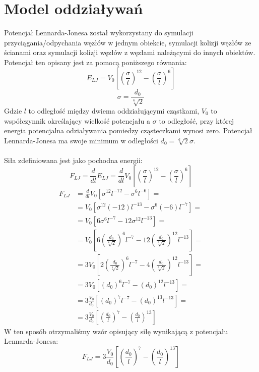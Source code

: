 \documentclass[12pt, letterpaper]{report}
\begin{document}
    \section{Model oddziaływań}
    Potencjał Lennarda-Jonesa został wykorzystany do symulacji przyciągania/odpychania 
    węzłów w jednym obiekcie, symulacji kolizji węzłów ze ścianami oraz symulacji
    kolizji węzłów z węzłami należącymi do innych obiektów. 
    Potencjał ten opisany jest za pomocą poniższego równania:
    \begin{equation}
        E_{LJ} = V_0 \left[ \left( \frac{\sigma}{l} \right)^{12} - \left( \frac{\sigma}{l} \right)^{6} \right]
    \end{equation}
    \begin{equation}
        \sigma = \frac{d_0}{\sqrt[6]{2}}
    \end{equation}
    Gdzie $l$ to odległość między dwiema oddziałującymi cząstkami, $V_0$ to współczynnik określający wielkość potencjału 
    a $\sigma$ to odległość, przy której energia potencjalna odziaływania pomiedzy cząsteczkami wynosi zero. 
    Potencjał Lennarda-Jonesa ma swoje minimum w odległości $d_0 = \sqrt[6]{2} \sigma$. \\ \\
    Siła zdefiniowana jest jako pochodna energii:
    \begin{equation}
        F_{LJ} = 
        \frac{d}{dl} E_{LJ} = 
        \frac{d}{dl} V_0 \left[ \left( \frac{\sigma}{l} \right)^{12} - \left( \frac{\sigma}{l} \right)^{6} \right]
    \end{equation}
    \begin{align*}
        F_{LJ} &= \frac{d}{dl} V_0 \left[ \sigma^{12}l^{-12} - \sigma^{6}l^{-6} \right] =\\
        &= V_0 \left[ \sigma^{12}(-12)l^{-13} - \sigma^{6}(-6)l^{-7} \right] =\\
        &= V_0 \left[ 6\sigma^{6}l^{-7} - 12\sigma^{12}l^{-13} \right] =\\
        &= V_0 \left[ 6 \left(\frac{d_0}{\sqrt[6]{2}}\right)^{6} l^{-7} - 12 \left(\frac{d_0}{\sqrt[6]{2}}\right)^{12} l^{-13} \right] =\\
        &= 3 V_0 \left[ 2 \left(\frac{d_0}{\sqrt[6]{2}}\right)^{6} l^{-7} - 4 \left(\frac{d_0}{\sqrt[6]{2}}\right)^{12} l^{-13} \right] =\\
        &= 3 V_0 \left[ (d_{0})^{6} l^{-7} - (d_{0})^{12} l^{-13} \right] =\\
        &= 3 \frac{V_0}{d_0} \left[ (d_{0})^{7} l^{-7} - (d_{0})^{13} l^{-13} \right] =\\
        &= 3\frac{V_0}{d_0} \left[ \left(\frac{d_0}{l}\right)^{7} - \left(\frac{d_0}{l}\right)^{13} \right]
    \end{align*}
    W ten sposób otrzymaliśmy wzór opisujący siłę wynikającą z potencjału Lennarda-Jonesa:
    \begin{equation}
        F_{LJ} = 3\frac{V_0}{d_0} \left[ \left(\frac{d_0}{l}\right)^{7} - \left(\frac{d_0}{l}\right)^{13} \right]
    \end{equation}
\end{document}
